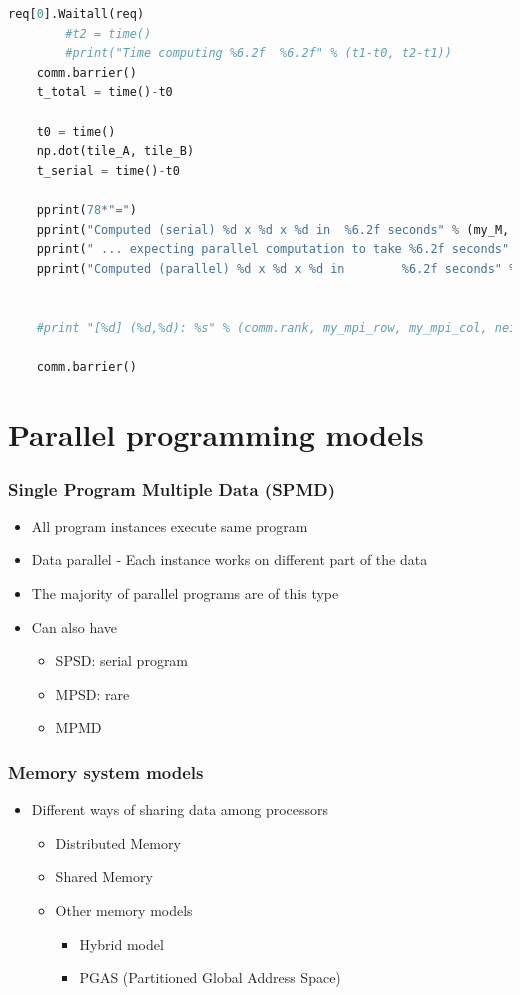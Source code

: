 \documentclass[10pt,t]{beamer}
\begin{document}
\begin{frame}
\begin{lstlisting}[language=Python,basicstyle=\fontsize{4}{5}\selectfont\ttfamily]
        req[0].Waitall(req)
        #t2 = time()
        #print("Time computing %6.2f  %6.2f" % (t1-t0, t2-t1))
    comm.barrier()
    t_total = time()-t0

    t0 = time()
    np.dot(tile_A, tile_B)
    t_serial = time()-t0

    pprint(78*"=")
    pprint("Computed (serial) %d x %d x %d in  %6.2f seconds" % (my_M, my_M, my_N, t_serial))
    pprint(" ... expecting parallel computation to take %6.2f seconds" % (mpi_rows*mpi_rows*mpi_cols*t_serial / comm.size))
    pprint("Computed (parallel) %d x %d x %d in        %6.2f seconds" % (mpi_rows*my_M, mpi_rows*my_M, mpi_cols*my_N, t_total))


    #print "[%d] (%d,%d): %s" % (comm.rank, my_mpi_row, my_mpi_col, neigh)

    comm.barrier()

\end{lstlisting}

\end{frame}

\section{Parallel programming models}
\begin{frame}
  \frametitle{Single Program Multiple Data (SPMD)}
  \begin{itemize}
  \item All program instances execute same program
  \item Data parallel - Each instance works on different part of the data
  \item The majority of parallel programs are of this type
  \item Can also have
    \begin{itemize}
    \item SPSD: serial program
    \item MPSD: rare
    \item MPMD 
    \end{itemize}
  \end{itemize}
\end{frame}

\begin{frame}
  \frametitle{Memory system models}
  \begin{itemize}
  \item Different ways of sharing data among processors
    \begin{itemize}
    \item Distributed Memory
    \item Shared Memory
    \item Other memory models
      \begin{itemize}
      \item Hybrid model
      \item PGAS (Partitioned Global Address Space) 
      \end{itemize}
    \end{itemize}
  \end{itemize}
\end{frame}
\end{document}

